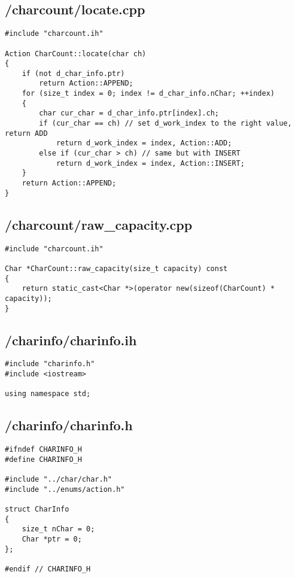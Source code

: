 \documentclass{article}
\begin{document}
\subsection*{/charcount/locate.cpp}
\begin{verbatim}
#include "charcount.ih"

Action CharCount::locate(char ch)
{
    if (not d_char_info.ptr)
        return Action::APPEND;
    for (size_t index = 0; index != d_char_info.nChar; ++index)
    {
        char cur_char = d_char_info.ptr[index].ch;
        if (cur_char == ch) // set d_work_index to the right value, return ADD
            return d_work_index = index, Action::ADD;
        else if (cur_char > ch) // same but with INSERT
            return d_work_index = index, Action::INSERT;
    }
    return Action::APPEND;
}
\end{verbatim}
\subsection*{/charcount/raw\_capacity.cpp}
\begin{verbatim}
#include "charcount.ih"

Char *CharCount::raw_capacity(size_t capacity) const
{
    return static_cast<Char *>(operator new(sizeof(CharCount) * capacity));
}
\end{verbatim}

\subsection*{/charinfo/charinfo.ih}
\begin{verbatim}
#include "charinfo.h"
#include <iostream>

using namespace std;

\end{verbatim}
\subsection*{/charinfo/charinfo.h}
\begin{verbatim}
#ifndef CHARINFO_H
#define CHARINFO_H

#include "../char/char.h"
#include "../enums/action.h"

struct CharInfo 
{
    size_t nChar = 0;
    Char *ptr = 0;
};

#endif // CHARINFO_H
\end{verbatim}
\end{document}
